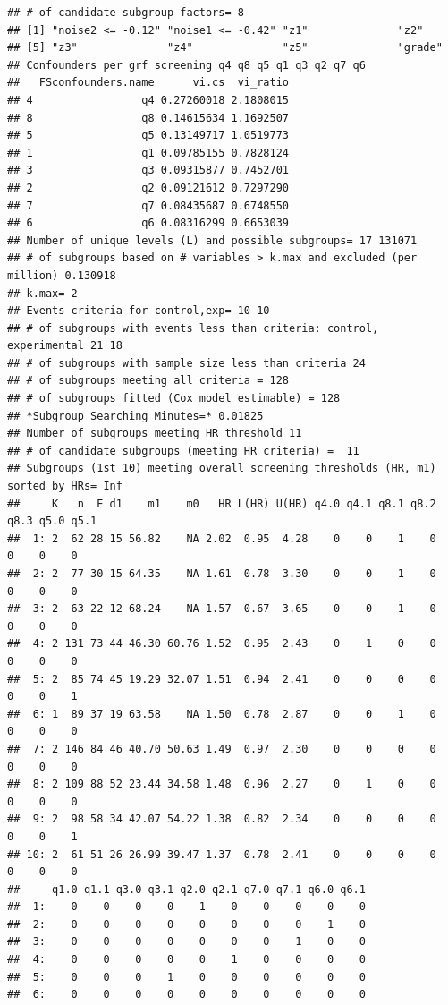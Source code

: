 \begin{knitrout}
\begin{kframe}
\begin{verbatim}
## # of candidate subgroup factors= 8 
## [1] "noise2 <= -0.12" "noise1 <= -0.42" "z1"              "z2"             
## [5] "z3"              "z4"              "z5"              "grade"          
## Confounders per grf screening q4 q8 q5 q1 q3 q2 q7 q6 
##   FSconfounders.name      vi.cs  vi_ratio
## 4                 q4 0.27260018 2.1808015
## 8                 q8 0.14615634 1.1692507
## 5                 q5 0.13149717 1.0519773
## 1                 q1 0.09785155 0.7828124
## 3                 q3 0.09315877 0.7452701
## 2                 q2 0.09121612 0.7297290
## 7                 q7 0.08435687 0.6748550
## 6                 q6 0.08316299 0.6653039
## Number of unique levels (L) and possible subgroups= 17 131071 
## # of subgroups based on # variables > k.max and excluded (per million) 0.130918 
## k.max= 2 
## Events criteria for control,exp= 10 10 
## # of subgroups with events less than criteria: control, experimental 21 18 
## # of subgroups with sample size less than criteria 24 
## # of subgroups meeting all criteria = 128 
## # of subgroups fitted (Cox model estimable) = 128 
## *Subgroup Searching Minutes=* 0.01825 
## Number of subgroups meeting HR threshold 11 
## # of candidate subgroups (meeting HR criteria) =  11 
## Subgroups (1st 10) meeting overall screening thresholds (HR, m1) sorted by HRs= Inf 
##     K   n  E d1    m1    m0   HR L(HR) U(HR) q4.0 q4.1 q8.1 q8.2 q8.3 q5.0 q5.1
##  1: 2  62 28 15 56.82    NA 2.02  0.95  4.28    0    0    1    0    0    0    0
##  2: 2  77 30 15 64.35    NA 1.61  0.78  3.30    0    0    1    0    0    0    0
##  3: 2  63 22 12 68.24    NA 1.57  0.67  3.65    0    0    1    0    0    0    0
##  4: 2 131 73 44 46.30 60.76 1.52  0.95  2.43    0    1    0    0    0    0    0
##  5: 2  85 74 45 19.29 32.07 1.51  0.94  2.41    0    0    0    0    0    0    1
##  6: 1  89 37 19 63.58    NA 1.50  0.78  2.87    0    0    1    0    0    0    0
##  7: 2 146 84 46 40.70 50.63 1.49  0.97  2.30    0    0    0    0    0    0    0
##  8: 2 109 88 52 23.44 34.58 1.48  0.96  2.27    0    1    0    0    0    0    0
##  9: 2  98 58 34 42.07 54.22 1.38  0.82  2.34    0    0    0    0    0    0    1
## 10: 2  61 51 26 26.99 39.47 1.37  0.78  2.41    0    0    0    0    0    0    0
##     q1.0 q1.1 q3.0 q3.1 q2.0 q2.1 q7.0 q7.1 q6.0 q6.1
##  1:    0    0    0    0    1    0    0    0    0    0
##  2:    0    0    0    0    0    0    0    0    1    0
##  3:    0    0    0    0    0    0    0    1    0    0
##  4:    0    0    0    0    0    1    0    0    0    0
##  5:    0    0    0    1    0    0    0    0    0    0
##  6:    0    0    0    0    0    0    0    0    0    0

\end{verbatim}
\end{kframe}
\end{knitrout}
